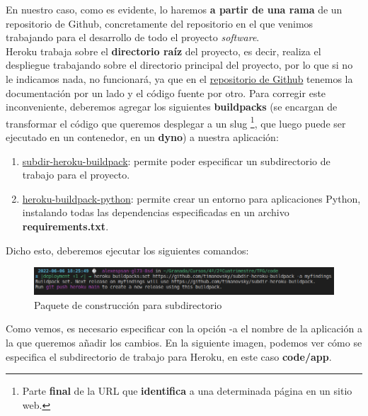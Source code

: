 En nuestro caso, como es evidente, lo haremos \textbf{a partir de una rama} de un
repositorio de Github, concretamente del repositorio en el que venimos trabajando
para el desarrollo de todo el proyecto \textit{software}.\\

Heroku trabaja sobre el \textbf{directorio raíz} del proyecto, es decir, realiza el
despliegue trabajando sobre el directorio principal del proyecto, por lo que si no le
indicamos nada, no funcionará, ya que en el \href{https://github.com/alexespana/TFG}
{repositorio de Github} tenemos la documentación por un lado y el código fuente por
otro. Para corregir este inconveniente, deberemos agregar los siguientes
\textbf{buildpacks} (se encargan de transformar el código que queremos desplegar a un
slug \footnote{Parte \textbf{final} de la URL que \textbf{identifica} a una determinada
página en un sitio web.}, que luego puede ser ejecutado en un contenedor, en un
\textbf{dyno}) a nuestra aplicación:

    \begin{enumerate}
        \item \href{https://elements.heroku.com/buildpacks/timanovsky/subdir-heroku-buildpack}
        {subdir-heroku-buildpack}: permite poder especificar un subdirectorio de trabajo
        para el proyecto.
        \item \href{https://elements.heroku.com/buildpacks/heroku/heroku-buildpack-python}
        {heroku-buildpack-python}: permite crear un entorno para aplicaciones Python,
        instalando todas las dependencias especificadas en un archivo
        \textbf{requirements.txt}.
    \end{enumerate}

Dicho esto, deberemos ejecutar los siguientes comandos:

    \begin{figure}[H]
        \centering
        \includegraphics[scale=0.39]{imagenes/first-buildpack.png}
        \caption{Paquete de construcción para subdirectorio}
        \label{fig:subdir-heroku-buildpack}
    \end{figure}

Como vemos, es necesario especificar con la opción -a el nombre de la aplicación a la que
queremos añadir los cambios. En la siguiente imagen, podemos ver cómo se especifica el
subdirectorio de trabajo para Heroku, en este caso \textbf{code/app}.

